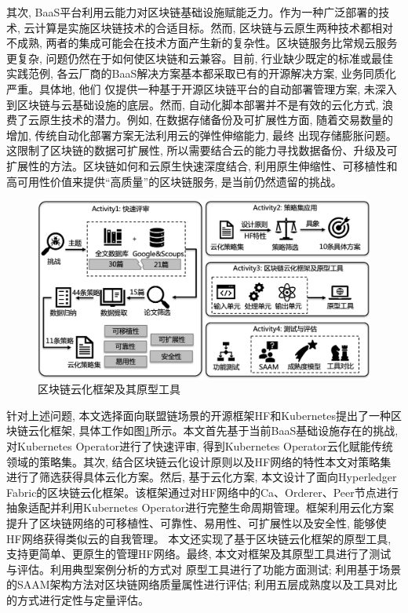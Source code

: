 其次, BaaS平台利用云能力对区块链基础设施赋能乏力。作为一种广泛部署的技术, 云计算是实施区块链技术的合适目标。然而, 区块链与云原生两种技术都相对不成熟, 两者的集成可能会在技术方面产生新的复杂性\cite{onik2019performance}。区块链服务比常规云服务更复杂, 问题仍然在于如何使区块链和云兼容\cite{gai2020blockchain}。目前, 行业缺少既定的标准或最佳实践范例, 各云厂商的BaaS解决方案基本都采取已有的开源解决方案, 业务同质化严重。具体地, 他们 仅提供一种基于开源区块链平台的自动部署管理方案, 未深入到区块链与云基础设施的底层。然而, 自动化脚本部署并不是有效的云化方式, 浪费了云原生技术的潜力。例如, 在数据存储备份及可扩展性方面, 随着交易数量的增加, 传统自动化部署方案无法利用云的弹性伸缩能力, 最终 出现存储膨胀问题。这限制了区块链的数据可扩展性, 所以需要结合云的能力寻找数据备份、升级及可扩展性的方法。区块链如何和云原生快速深度结合, 利用原生伸缩性、可移植性和高可用性价值来提供“高质量”的区块链服务, 是当前仍然遗留的挑战。


\begin{figure}[h] %
    \centering %
    \includegraphics[width=1.0\textwidth]{FIGs/chapter1/process.png} %
    \caption{区块链云化框架及其原型工具} %
    \label{framework_tool} %
\end{figure}%

针对上述问题, 本文选择面向联盟链场景的开源框架HF和Kubernetes提出了一种区块链云化框架, 具体工作如图\ref{framework_tool}所示。本文首先基于当前BaaS基础设施存在的挑战, 对Kubernetes Operator进行了快速评审, 得到Kubernetes Operator云化赋能传统领域的策略集。其次, 结合区块链云化设计原则以及HF网络的特性本文对策略集进行了筛选获得具体云化方案。然后, 基于云化方案, 本文设计了面向Hyperledger Fabric的区块链云化框架。该框架通过对HF网络中的Ca、Orderer、Peer节点进行抽象适配并利用Kubernetes Operator进行完整生命周期管理。框架利用云化方案提升了区块链网络的可移植性、可靠性、易用性、可扩展性以及安全性, 能够使HF网络获得类似云的自我管理。 本文还实现了基于区块链云化框架的原型工具, 支持更简单、更原生的管理HF网络。最终, 本文对框架及其原型工具进行了测试与评估。利用典型案例分析的方式对 原型工具进行了功能方面测试; 利用基于场景的SAAM架构方法对区块链网络质量属性进行评估; 利用五层成熟度以及工具对比的方式进行定性与定量评估。

